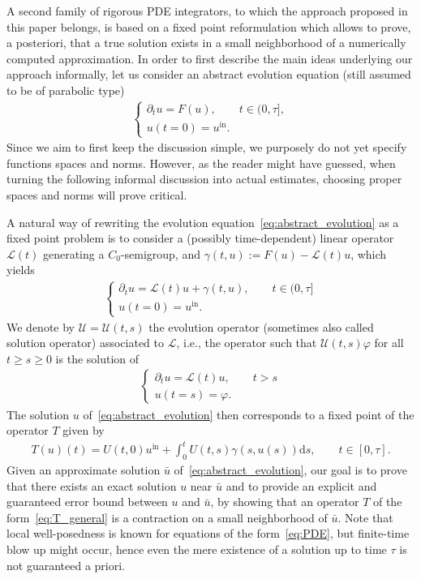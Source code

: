 \documentclass[10pt,a4paper]{article}
\theoremstyle{plain}
\newcommand{\U}{\mathcal{U}}
\renewcommand{\L}{\mathcal{L}}
\newcommand{\bu}{\bar{u}}
\newcommand{\1}{\mathbf{1}}
\renewcommand{\d}{\mathrm{d}}
\newcommand{\uin}{{u^{\mathrm{in}}}}
\begin{document}
A second family of rigorous PDE integrators, to which the approach proposed in this paper belongs, is based on a fixed point reformulation which allows to prove, a posteriori, that a true solution exists in a small neighborhood of a numerically computed approximation. In order to first describe the main ideas underlying our approach informally, let us consider an abstract evolution equation (still assumed to be of parabolic type)
\begin{align}
\label{eq:abstract_evolution}
\begin{cases}
\partial_t u = F(u),\qquad t\in(0,\tau], \\
u(t=0) = \uin.
\end{cases}
\end{align}
Since we aim to first keep the discussion simple, we purposely do not yet specify functions spaces and norms. However, as the reader might have guessed, when turning the following informal discussion into actual estimates, choosing proper spaces and norms will prove critical.

A natural way of rewriting the evolution equation~\eqref{eq:abstract_evolution} as a fixed point problem is to consider a (possibly time-dependent) linear operator $\L(t)$ generating a $C_0$-semigroup, and $\gamma(t,u):= F(u) - \L(t) u$, which yields
\begin{align}
\label{eq:abstract_evolution_split}
\begin{cases}
\partial_t u = \L(t) u + \gamma(t,u),\qquad t\in(0,\tau] \\
u(t=0) = \uin.
\end{cases}
\end{align}
We denote by $\U=\U(t,s)$ the evolution operator (sometimes also called solution operator) associated to $\L$, i.e., the operator such that $\U(t,s)\varphi$ for all $t\geq s\geq 0$ is the solution of
\begin{align*}
\begin{cases}
\partial_t u = \L(t)u,\qquad t>s \\
u(t=s) = \varphi.
\end{cases}
\end{align*}
The solution $u$ of~\eqref{eq:abstract_evolution} then corresponds to a fixed point of the operator $T$ given by
\begin{align}
\label{eq:T_general}
T(u)(t) = U(t,0) \uin + \int_0^t U(t,s) \gamma(s,u(s)) \d s,\qquad t\in[0,\tau].
\end{align}
Given an approximate solution $\bu$ of~\eqref{eq:abstract_evolution}, our goal is to prove that there exists an exact solution $u$ near $\bu$ and to provide an explicit and guaranteed error bound between $u$ and $\bu$, by showing that an operator $T$ of the form~\eqref{eq:T_general} is a contraction on a small neighborhood of $\bu$. Note that local well-posedness is known for equations of the form~\eqref{eq:PDE}, but finite-time blow up might occur, hence even the mere existence of a solution up to time $\tau$ is not guaranteed a priori.
\end{document}
